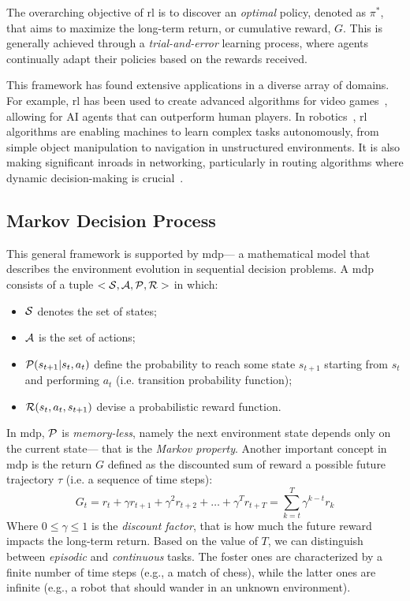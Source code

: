 The overarching objective of \ac{rl} is to discover an \emph{optimal} policy, 
 denoted as $\pi^*$, that aims to maximize the long-term return, or cumulative reward, $G$. 
 This is generally achieved through a \emph{trial-and-error} learning process, 
 where agents continually adapt their policies based on the rewards received.

This framework has found extensive applications in a diverse array of domains. 
 For example, \ac{rl} has been used to create advanced algorithms for video games~\cite{DBLP:journals/spm/ArulkumaranDBB17}, 
 allowing for AI agents that can outperform human players. 
% 
In robotics~\cite{DBLP:journals/ijrr/KoberBP13}, 
 \ac{rl} algorithms are enabling machines to learn complex tasks autonomously, 
 from simple object manipulation to navigation in unstructured environments. 
 It is also making significant inroads in networking, 
 particularly in routing algorithms where dynamic decision-making is crucial~\cite{DBLP:journals/comsur/LuongHGNWLK19}.

\subsection{Markov Decision Process}
This general framework is supported by \ac{mdp}---
 a mathematical model that describes the environment evolution in sequential decision problems. 
%
A \ac{mdp} consists of a tuple $<\mathcal{S}, \mathcal{A}, \mathcal{P}, \mathcal{R}>$ in which:
\begin{itemize}
  \item $\mathcal{S}$ denotes the set of states;
  \item $\mathcal{A}$ is the set of actions;
  \item $\mathcal{P}(s_{t + 1} | s_t, a_t)$ define the probability to reach some state $s_{t + 1}$ starting from $s_t$ and performing $a_t$ (i.e. transition probability function);
  \item $\mathcal{R}(s_t, a_t, s_{t+1})$ devise a probabilistic reward function.
\end{itemize}
In \ac{mdp}, $\mathcal{P}$ is \emph{memory-less}, 
 namely the next environment state depends only on the current state---
 that is the \emph{Markov property}.
Another important concept in \ac{mdp} is the return 
 $G$ defined as the discounted sum of reward a possible future trajectory $\tau$ (i.e. a sequence of time steps):
\begin{equation}
G_{t} = r_t + \gamma r_{t + 1} + \gamma^2 r_{t + 2} + \dots + \gamma^T r_{t + T} = \sum_{k = t}^T \gamma^{k-t} r_k
\end{equation}
Where $0 \leq \gamma \leq 1$ is the \emph{discount factor}, 
 that is how much the future reward impacts the long-term return.
Based on the value of $T$, 
 we can distinguish between \emph{episodic} and \emph{continuous} tasks.
 The foster ones are characterized by a finite number of time steps (e.g., a match of chess), 
 while the latter ones are infinite (e.g., a robot that should wander in an unknown environment).
